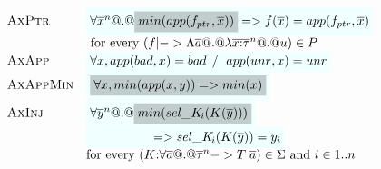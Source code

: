 \begin{figure}
{\[\begin{array}{c}
\begin{array}{lll}
 \textsc{AxPtr}  & \formula{\forall \oln{x}{n} @.@ \highlight{min(app(f_{ptr},\xs))} => f(\ol{x}) = app(f_{ptr},\xs)} \\
                 & \text{ for every } (f |-> \Lambda\as @.@ \lambda\oln{x{:}\tau}{n} @.@ u) \in P \\
 \textsc{AxApp}  & \formula{\forall x, app(\bad,x) = \bad \; /\ \; app(\unr,x) = \unr}    \\ 
 \textsc{AxAppMin}& \formula{\highlight{\forall x, min(app(x,y)) => min(x)}} \\ 
 \textsc{AxInj}   & \formula{\forall \oln{y}{n} @.@ \highlight{min(\sel{K}{i}(K(\ys)))}} \\ %
                  & \formula{\quad\qquad\qquad => \sel{K}{i}(K(\ys)) = y_i} \\ 
                  & \text{for every } (K{:}\forall\as @.@ \oln{\tau}{n} -> T\;\as) \in \Sigma \text{ and } i \in 1..n 

\end{array}
\end{array}\]}
\end{figure}
